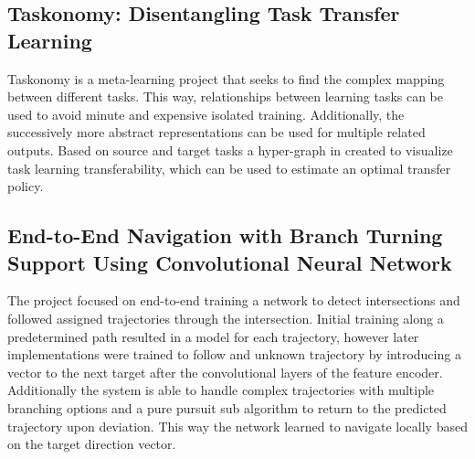 \documentclass[sigconf, nonacm]{acmart}
\begin{document}
\subsection{Taskonomy: Disentangling Task Transfer Learning \cite{Taskonomy}}
Taskonomy is a meta-learning project that seeks to find the complex mapping between different tasks.
This way, relationships between learning tasks can be used to avoid minute and expensive isolated training.
Additionally, the successively more abstract representations can be used for multiple related outputs.
Based on source and target tasks a hyper-graph in created to visualize task learning transferability, which can be used to estimate an optimal transfer policy.

\subsection{End-to-End Navigation with Branch Turning Support Using Convolutional Neural Network \cite{E2ENavigation}}
The project focused on end-to-end training a network to detect intersections and followed assigned trajectories through the intersection.
Initial training along a predetermined path resulted in a model for each trajectory, however later implementations were trained to follow and unknown trajectory by introducing a vector to the next target after the convolutional layers of the feature encoder.
Additionally the system is able to handle complex trajectories with multiple branching options and a pure pursuit sub algorithm to return to the predicted trajectory upon deviation.
This way the network learned to navigate locally based on the target direction vector.
\end{document}
